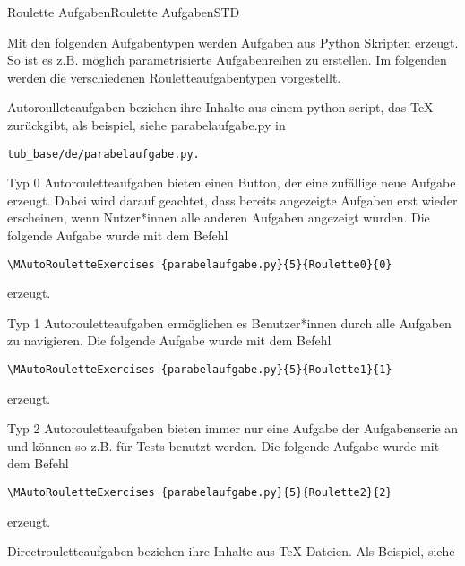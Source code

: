 \begin{MXContent}{Roulette Aufgaben}{Roulette Aufgaben}{STD}

Mit den folgenden Aufgabentypen werden Aufgaben aus Python Skripten erzeugt. So ist es z.B.
möglich parametrisierte Aufgabenreihen zu erstellen. Im folgenden werden die verschiedenen
Rouletteaufgabentypen vorgestellt.

Autoroulleteaufgaben beziehen ihre Inhalte aus einem python script, das TeX zurückgibt, als beispiel, siehe parabelaufgabe.py in
\begin{verbatim}
tub_base/de/parabelaufgabe.py.
\end{verbatim}

Typ 0 Autorouletteaufgaben bieten einen Button, der eine zufällige neue Aufgabe erzeugt. Dabei wird darauf geachtet, dass bereits angezeigte Aufgaben erst wieder erscheinen, wenn 
Nutzer*innen alle anderen Aufgaben angezeigt wurden.
Die folgende Aufgabe wurde mit dem Befehl
\begin{verbatim}
\MAutoRouletteExercises {parabelaufgabe.py}{5}{Roulette0}{0}
\end{verbatim}
erzeugt.

Typ 1 Autorouletteaufgaben ermöglichen es Benutzer*innen durch alle Aufgaben zu navigieren.
Die folgende Aufgabe wurde mit dem Befehl
\begin{verbatim}
\MAutoRouletteExercises {parabelaufgabe.py}{5}{Roulette1}{1}
\end{verbatim}
erzeugt.

Typ 2 Autorouletteaufgaben bieten immer nur eine Aufgabe der Aufgabenserie an und können so z.B. für Tests benutzt werden.
Die folgende Aufgabe wurde mit dem Befehl
\begin{verbatim}
\MAutoRouletteExercises {parabelaufgabe.py}{5}{Roulette2}{2}
\end{verbatim}
erzeugt.

Directrouletteaufgaben beziehen ihre Inhalte aus TeX-Dateien. Als Beispiel, siehe 

\end{MXContent}

